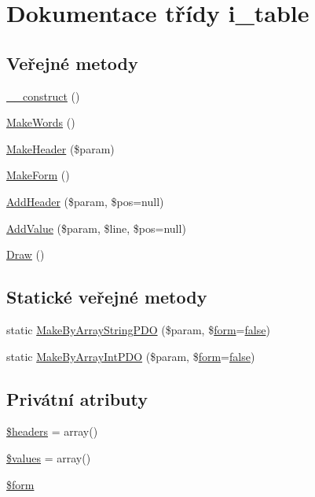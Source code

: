 \hypertarget{classi__table}{\section{Dokumentace třídy i\-\_\-table}
\label{classi__table}
}
\subsection*{Veřejné metody}
\begin{DoxyCompactItemize}
\item 
\hyperlink{classi__table_aa4b0866e853245aac84d3bdf7001bff1}{\-\_\-\-\_\-construct} ()
\item 
\hyperlink{classi__table_a3b870208f946d3b5e52acb4c0e1223bc}{Make\-Words} ()
\item 
\hyperlink{classi__table_ab76e37e9a1bdaedeefb64e9551306f0f}{Make\-Header} (\$param)
\item 
\hyperlink{classi__table_a869a217163b246771b3ce12fa7214991}{Make\-Form} ()
\item 
\hyperlink{classi__table_a3c427acf7d0430d5c407f579ba4e2353}{Add\-Header} (\$param, \$pos=null)
\item 
\hyperlink{classi__table_a7ceafece6b46a5fb060436ece2bdcab2}{Add\-Value} (\$param, \$line, \$pos=null)
\item 
\hyperlink{classi__table_a77d5bbc9a86536376f4248957115f60e}{Draw} ()
\end{DoxyCompactItemize}
\subsection*{Statické veřejné metody}
\begin{DoxyCompactItemize}
\item 
static \hyperlink{classi__table_a915f1235e6c93b4e8657e38613b7827c}{Make\-By\-Array\-String\-P\-D\-O} (\$param, \$\hyperlink{classform}{form}=\hyperlink{ttfontsuni_8php_afbaa04e5cc97693dc668b3c45d3dd740}{false})
\item 
static \hyperlink{classi__table_a381aeec9227a393db7a3289593c2a8de}{Make\-By\-Array\-Int\-P\-D\-O} (\$param, \$\hyperlink{classform}{form}=\hyperlink{ttfontsuni_8php_afbaa04e5cc97693dc668b3c45d3dd740}{false})
\end{DoxyCompactItemize}
\subsection*{Privátní atributy}
\begin{DoxyCompactItemize}
\item 
\hyperlink{classi__table_aafeab09cd2305339aa9cc61c0da380da}{\$headers} = array()
\item 
\hyperlink{classi__table_a4a9cba4b5863bea1cb70f6d0d0f76956}{\$values} = array()
\item 
\hyperlink{classi__table_a895b1d8f6eefed7a067e781b0200d071}{\$form}
\end{DoxyCompactItemize}


